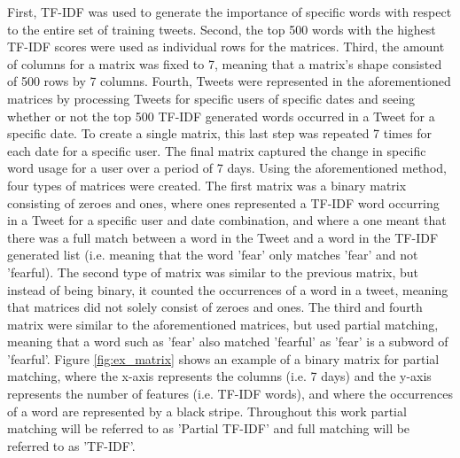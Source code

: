 \documentclass[sigconf]{acmart-txmm}
\begin{document}
First, TF-IDF was used to generate the importance of specific words with respect to the entire set of training tweets. Second, the top 500 words with the highest TF-IDF scores were used as individual rows for the matrices. Third, the amount of columns for a matrix was fixed to 7, meaning that a matrix's shape consisted of 500 rows by 7 columns. Fourth, Tweets were represented in the aforementioned matrices by processing Tweets for specific users of specific dates and seeing whether or not the top 500 TF-IDF generated words occurred in a Tweet for a specific date. To create a single matrix, this last step was repeated 7 times for each date for a specific user. The final matrix captured the change in specific word usage for a user over a period of 7 days. Using the aforementioned method, four types of matrices were created. The first matrix was a binary matrix consisting of zeroes and ones, where ones represented a TF-IDF word occurring in a Tweet for a specific user and date combination, and where a one meant that there was a full match between a word in the Tweet and a word in the TF-IDF generated list (i.e. meaning that the word 'fear' only matches 'fear' and not 'fearful). The second type of matrix was similar to the previous matrix, but instead of being binary, it counted the occurrences of a word in a tweet, meaning that matrices did not solely consist of zeroes and ones. The third and fourth matrix were similar to the aforementioned matrices, but used partial matching, meaning that a word such as 'fear' also matched 'fearful' as 'fear' is a subword of 'fearful'. Figure \ref{fig:ex_matrix} shows an example of a binary matrix for partial matching, where the x-axis represents the columns (i.e. 7 days) and the y-axis represents the number of features (i.e. TF-IDF words), and where the occurrences of a word are represented by a black stripe. Throughout this work partial matching will be referred to as 'Partial TF-IDF' and full matching will be referred to as 'TF-IDF'.
\end{document}
